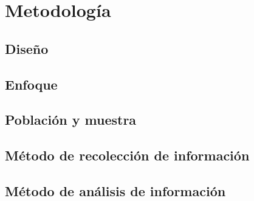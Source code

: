 \chapter{Metodología}
\section{Diseño}
\section{Enfoque}
\section{Población y muestra}
\section{Método de recolección de información}
\section{Método de análisis de información}

